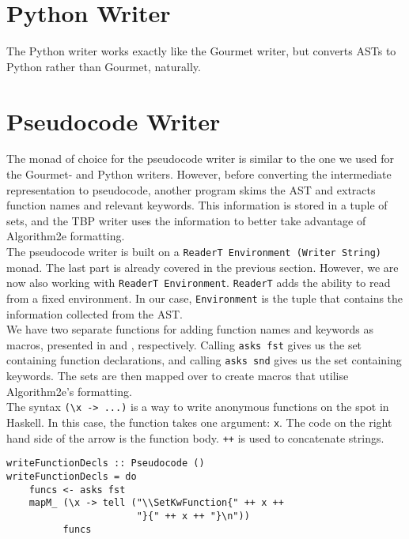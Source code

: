 \section{Python Writer}

The Python writer works exactly like the Gourmet writer, but converts ASTs to Python rather than Gourmet, naturally.

\section{Pseudocode Writer}

The monad of choice for the pseudocode writer is similar to the one we used for the Gourmet- and Python writers. However, before converting the intermediate representation to pseudocode, another program skims the AST and extracts function names and relevant keywords. This information is stored in a tuple of sets, and the TBP writer uses the information to better take advantage of Algorithm2e formatting. \\

The pseudocode writer is built on a \texttt{ReaderT Environment (Writer String)} monad. The last part is already covered in the previous section. However, we are now also working with \texttt{ReaderT Environment}. \texttt{ReaderT} adds the ability to read from a fixed environment. In our case, \texttt{Environment} is the tuple that contains the information collected from the AST. \\

We have two separate functions for adding function names and keywords as macros, presented in  and , respectively. Calling \texttt{asks fst} gives us the set containing function declarations, and calling \texttt{asks snd} gives us the set containing keywords. The sets are then mapped over to create macros that utilise Algorithm2e's formatting. \\

The syntax \texttt{(\textbackslash x -> ...)} is a way to write anonymous functions on the spot in Haskell. In this case, the function takes one argument: \texttt{x}. The code on the right hand side of the arrow is the function body. \texttt{++} is used to concatenate strings. \\

\begin{lstlisting}[caption={Adding LaTeX macros for function declarations.}, captionpos=b, label={writeFD}]
writeFunctionDecls :: Pseudocode ()
writeFunctionDecls = do
    funcs <- asks fst
    mapM_ (\x -> tell ("\\SetKwFunction{" ++ x ++
                       "}{" ++ x ++ "}\n"))
          funcs
\end{lstlisting}

